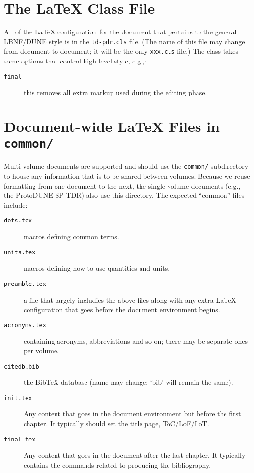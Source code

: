 \section{The \LaTeX{} Class File}
\label{sec:tech-classfile}

All of the \LaTeX{} configuration for the document that pertains to
the general LBNF/DUNE style is in the
\texttt{td-pdr.cls} file. (The name of this file may change from document to document; it will be the only \texttt{xxx.cls} file.)
The class takes some options that control high-level style, e.g.,:

\begin{description}
\item[\texttt{final}] this removes all extra markup used during the
  editing phase.
\end{description}


\section{Document-wide \LaTeX{} Files in \texttt{common/}}
\label{sec:tech-common}

Multi-volume documents are supported and should use the
\texttt{common/} subdirectory to house any information that is to be
shared between volumes.
Because we reuse formatting from one document to the next, the single-volume documents (e.g., the ProtoDUNE-SP TDR) also use this directory.
The expected ``common'' files include:
\begin{description}
\item[\texttt{defs.tex}] macros defining common terms.
\item[\texttt{units.tex}] macros defining how to use quantities and units.
\item[\texttt{preamble.tex}] a file that largely includies the above files along with
  any extra \LaTeX{} configuration that goes before the document
  environment begins.
\item[\texttt{acronyms.tex}] containing acronyms, abbreviations and so on; there may be separate ones per volume.
\item[\texttt{citedb.bib}] the BibTeX database (name may change; `bib' will remain the same).
\item[\texttt{init.tex}] Any content that goes in the document
  environment but before the first chapter.
  It typically should set the title page, ToC/LoF/LoT.
\item[\texttt{final.tex}] Any content that goes in the document after
  the last chapter.
  It typically contains the commands related to producing the
  bibliography.
\end{description}

